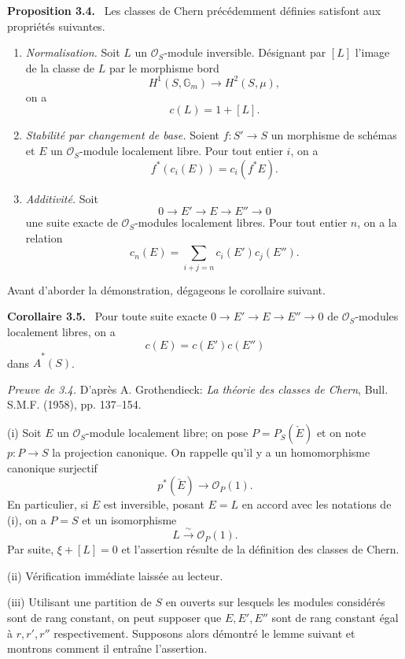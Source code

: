 \documentclass[11pt]{article}
\newenvironment{statement}[1]{\par\medskip\noindent\textbf{#1.}\ }{\par\medskip}
\begin{document}
\begin{statement}{Proposition 3.4}
Les classes de Chern précédemment définies satisfont aux propriétés suivantes.
\begin{enumerate}[label=(\roman*)]
\item \emph{Normalisation.} Soit $L$ un $\mathcal O_S$-module inversible. Désignant par $[L]$ l'image de la classe de $L$ par le morphisme bord
\[
H^1(S,\mathbb G_m)\longrightarrow H^2(S,\mu),
\]
on a
\[
c(L)=1+[L].
\]
\item \emph{Stabilité par changement de base.} Soient $f:S'\to S$ un morphisme de schémas et $E$ un $\mathcal O_S$-module localement libre. Pour tout entier $i$, on a
\[
f^*(c_i(E))=c_i(f^*E).
\]
\item \emph{Additivité.} Soit
\[
0\to E'\to E\to E''\to0
\]
une suite exacte de $\mathcal O_S$-modules localement libres. Pour tout entier $n$, on a la relation
\[
c_n(E)=\sum_{i+j=n}c_i(E')c_j(E'').
\]
\end{enumerate}
\end{statement}

Avant d'aborder la démonstration, dégageons le corollaire suivant.

\begin{statement}{Corollaire 3.5}
Pour toute suite exacte $0\to E'\to E\to E''\to0$ de $\mathcal O_S$-modules localement libres, on a
\[
c(E)=c(E')c(E'')
\]
dans $\widehat A^*(S)$.
\end{statement}

\emph{Preuve de 3.4.} D'après A. Grothendieck: \emph{La théorie des classes de Chern}, Bull. S.M.F. (1958), pp. 137--154.

(i) Soit $E$ un $\mathcal O_S$-module localement libre; on pose $P=P_S(\check E)$ et on note $p:P\to S$ la projection canonique. On rappelle qu'il y a un homomorphisme canonique surjectif
\[
p^*(\check E)\longrightarrow \mathcal O_P(1).
\]
En particulier, si $E$ est inversible, posant $E=L$ en accord avec les notations de (i), on a $P=S$ et un isomorphisme
\[
L\xrightarrow{\sim}\mathcal O_P(1).
\]
Par suite, $\xi+[L]=0$ et l'assertion résulte de la définition des classes de Chern.

(ii) Vérification immédiate laissée au lecteur.

(iii) Utilisant une partition de $S$ en ouverts sur lesquels les modules considérés sont de rang constant, on peut supposer que $E,E',E''$ sont de rang constant égal à $r,r',r''$ respectivement. Supposons alors démontré le lemme suivant et montrons comment il entraîne l'assertion.
\end{document}
